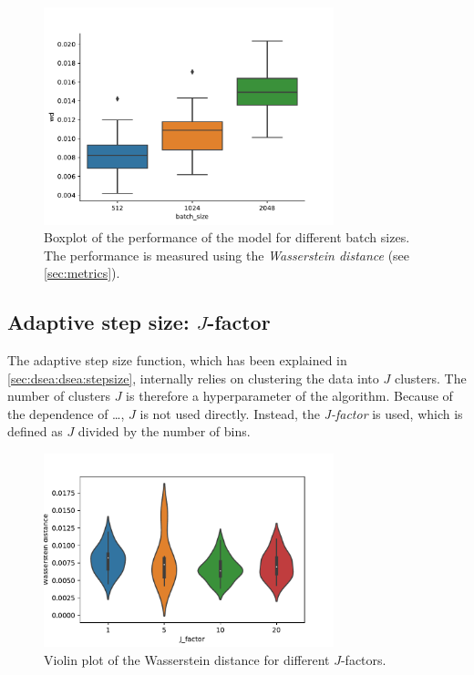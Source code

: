 \begin{figure}
  \centering
  \includegraphics[width=0.75\textwidth]{content/plots/hyperparam/batch_size_vs_wd_boxplot.pdf}
  \caption{Boxplot of the performance of the model for different batch sizes.
    The performance is measured using the \emph{Wasserstein distance} (see \autoref{sec:metrics}).
  }
  \label{fig:hyperparameter:batch_size}
\end{figure}


\subsection{Adaptive step size: $J$-factor}
The adaptive step size function,
  which has been explained in \autoref{sec:dsea:dsea:stepsize},
internally relies on clustering the data into $J$ clusters.
The number of clusters $J$ is therefore a hyperparameter of the algorithm.
Because of the dependence of …,
$J$ is not used directly.
Instead, the \emph{J-factor} is used,
which is defined as $J$ divided by the number of bins.

\begin{figure}
  \centering
  \includegraphics[width=0.75\textwidth]{content/plots/halftime/wd_per_J_factor.pdf}
  \caption{Violin plot of the Wasserstein distance for different $J$-factors.}
  \label{fig:hyperparameter:J_factor}
\end{figure}


